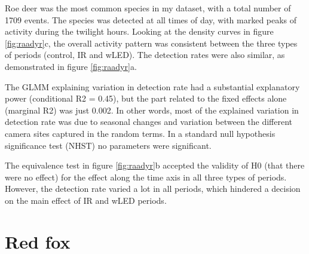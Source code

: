\begin{table}[ht]
Roe deer was the most common species in my dataset, with a total number of 1709 events.
The species was detected at all times of day, with marked peaks of activity during the twilight hours.
Looking at the density curves in figure \ref{fig:raadyr}c, the overall activity pattern was consistent between the three types of periods (control, IR and wLED). 
The detection rates were also similar, as demonstrated in figure \ref{fig:raadyr}a.

The GLMM explaining variation in detection rate had a substantial explanatory power (conditional R2 = 0.45), but the part related to the fixed effects alone (marginal R2) was just 0.002.
In other words, most of the explained variation in detection rate was due to seasonal changes and variation between the different camera sites captured in the random terms.
In a standard null hypothesis significance test (NHST) no parameters were significant.

The equivalence test in figure \ref{fig:raadyr}b accepted the validity of H0 (that there were no effect) for the effect along the time axis in all three types of periods.
However, the detection rate varied a lot in all periods, which hindered a decision on the main effect of IR and wLED periods. 




\newpage
\section{Red fox}


\end{table}

